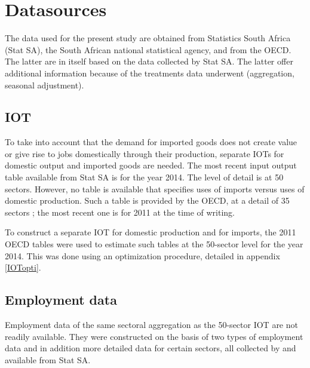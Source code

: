 \documentclass[12pt,english]{article}
\begin{document}
\section{Datasources}

The data used for the present study are obtained from Statistics South Africa (Stat SA), the South African national statistical agency, and from the OECD. The latter are in itself based on the data collected by Stat SA. The latter offer additional information because of the treatments data underwent (aggregation, seasonal adjustment). %

\subsection{IOT}	

To take into account that the demand for imported goods does not create value or give rise to jobs domestically through their production, separate IOTs for domestic output and imported goods are needed. The most recent input output table available from Stat SA is for the year 2014. The level of detail is at 50 sectors. However, no table is available that specifies uses of imports versus uses of domestic production. Such a table is provided by the OECD, at a detail of 35 sectors ; the most recent one is for 2011 at the time of writing.

To construct a separate IOT for domestic production and for imports, the 2011 OECD tables were used to estimate such tables at the 50-sector level for the year 2014. This was done using an optimization procedure, detailed in appendix \ref{IOTopti}.


\subsection{Employment data}
Employment data of the same sectoral aggregation as the 50-sector IOT are not readily available. They were constructed on the basis of two types of employment data and in addition more detailed data for certain sectors, all collected by and available from Stat SA.
 
\end{document}
